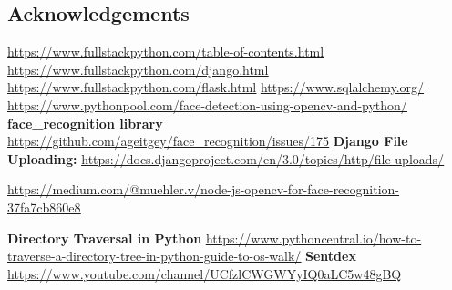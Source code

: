 \documentclass{article}
\begin{document}
\begin{flushleft}
\section{Acknowledgements}

\underline{\url{https://www.fullstackpython.com/table-of-contents.html}}
\newline
\underline{\url{https://www.fullstackpython.com/django.html}}
\newline
\underline{\url{https://www.fullstackpython.com/flask.html}}
\newline
\underline{\url{https://www.sqlalchemy.org/}}
\newline
\underline{\url{https://www.pythonpool.com/face-detection-using-opencv-and-python/}}
\newline
\newline
\textbf{face\_recognition library}
\underline{\url{https://github.com/ageitgey/face\_recognition/issues/175}}
\newline
\newline
\textbf{Django File Uploading:}
\underline{\url{https://docs.djangoproject.com/en/3.0/topics/http/file-uploads/}}
\newline

\underline{\url{https://medium.com/@muehler.v/node-js-opencv-for-face-recognition-37fa7cb860e8}}
\newline

\textbf{Directory Traversal in Python}
\underline{\url{https://www.pythoncentral.io/how-to-traverse-a-directory-tree-in-python-guide-to-os-walk/}}
\newline
\newline
\textbf{Sentdex}
\newline
\underline{\url{https://www.youtube.com/channel/UCfzlCWGWYyIQ0aLC5w48gBQ}}

\end{flushleft}
\end{document}
